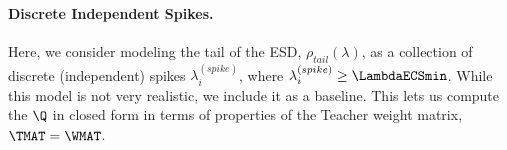 




\paragraph{Discrete Independent Spikes.}

Here, we consider modeling the tail of the ESD, $\rho_{tail}(\lambda)$, as a collection of discrete (independent) spikes $\lambda_{i}^{(spike)}$, where $\lambda_{i}^{(spike)}\ge \LambdaECSmin$.
While this model is not very realistic, we include it as a baseline.
This lets us compute the \LayerQuality $\Q$ in closed form in terms of properties of the Teacher weight matrix, $\TMAT=\WMAT$.

